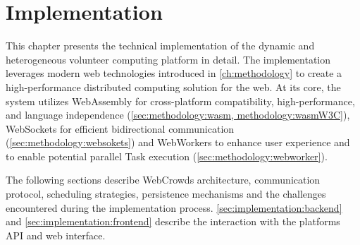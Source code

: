 \chapter{Implementation}
\label{ch:implementation}
This chapter presents the technical implementation of the dynamic and heterogeneous volunteer computing platform in detail. The implementation leverages modern web technologies introduced in \autoref{ch:methodology} to create a high-performance distributed computing solution for the web. At its core, the system utilizes WebAssembly for cross-platform compatibility, high-performance, and language independence (\autoref{sec:methodology:wasm, methodology:wasmW3C}), WebSockets for efficient bidirectional communication (\autoref{sec:methodology:websokets}) and WebWorkers to enhance user experience and to enable potential parallel Task execution (\autoref{sec:methodology:webworker}).

The following sections describe WebCrowds architecture, communication protocol, scheduling strategies, persistence mechanisms and the challenges encountered during the implementation process. \autoref{sec:implementation:backend} and \autoref{sec:implementation:frontend} describe the interaction with the platforms API and web interface.

